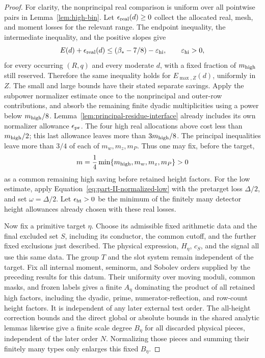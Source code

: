 \begin{proof}
For clarity, the nonprincipal real comparison is uniform over all
pointwise pairs in Lemma~\ref{lem:high-bin}.  Let
\(\epsilon_{\rm real}(d)\ge0\) collect the allocated real, mesh, and
moment losses for the relevant range.  The endpoint inequality,
the intermediate inequality, and the positive slopes give
\begin{equation}\label{eq:saving-criterion}
 E(d)+\epsilon_{\rm real}(d)
 \le(\beta_*-7/8)-\varepsilon_{\rm hi},
 \qquad \varepsilon_{\rm hi}>0,
\end{equation}
for every occurring \((R,q)\) and every moderate \(d\), with a fixed
fraction of \(m_{\rm high}\) still reserved.  Therefore the same
inequality holds for \(E_{\max,Z}(d)\), uniformly in \(Z\).
The small and large bounds have their stated separate savings.
Apply the subpower normalizer estimate once to the nonprincipal and
outer-row contributions, and absorb the remaining finite dyadic
multiplicities using a power below \(m_{\rm high}/8\).
Lemma~\ref{lem:principal-residue-interface} already includes its own normalizer allowance
\(\epsilon_{\rm pr}\).  The four high real allocations above cost less
than \(m_{\rm high}/2\); this last allowance leaves more than
\(3m_{\rm high}/8\).  The principal inequalities leave more than
\(3/4\) of each of \(m_w,m_z,m_P\).  Thus one may fix, before the target,
\[
 m=\frac14\min\{m_{\rm high},m_w,m_z,m_P\}>0
\]
as a common remaining high saving before retained height factors.
For the low estimate, apply Equation~\eqref{eq:part-II-normalized-low}
with the pretarget loss \(\Delta/2\), and set \(\omega=\Delta/2\).
Let \(\epsilon_{\rm ht}>0\) be the minimum of the finitely many detector
height allowances already chosen with these real losses.

Now fix a primitive target \(\eta\).  Choose its admissible fixed
arithmetic data and the final excluded set \(S\), including its conductor,
the common cutoff, and the further fixed exclusions just described.
The physical expression, \(H_\eta\), \(c_S\), and the signal all use this
same data.  The group \(T\) and the slot system remain independent of
the target.  Fix all internal moment, seminorm, and Sobolev orders
supplied by the preceding results for this datum.  Their uniformity over
moving moduli, common masks, and frozen labels gives a finite
\(A_\eta\) dominating the product of all retained high factors, including
the dyadic, prime, numerator-reflection, and row-count height factors.
It is independent of any later external test order.  The all-height
correction bounds and the direct global or absolute bounds in the shared
analytic lemmas likewise give a finite scale degree \(B_\eta\) for all
discarded physical pieces, independent of the later order \(N\).
Normalizing those pieces and summing their finitely many types only
enlarges this fixed \(B_\eta\).


\end{proof}
